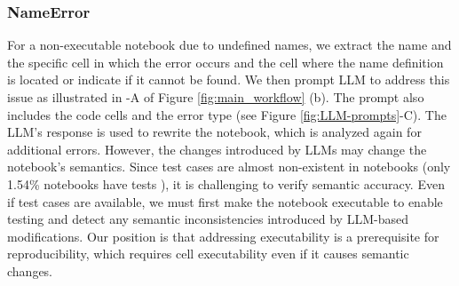      
        \subsubsection{NameError}
            For a non-executable notebook due to undefined names, we extract the name and the specific cell in which the error occurs and the cell where the name definition is located or indicate if it cannot be found.  We then prompt LLM to address this issue as illustrated in -A of Figure \ref{fig:main_workflow} (b). The prompt also includes the code cells and the error type (see Figure \ref{fig:LLM-prompts}-C). The LLM's response is used to rewrite the notebook, which is analyzed again for additional errors. However, the changes introduced by LLMs may change the notebook's semantics. Since test cases are almost non-existent in notebooks (only 1.54\% notebooks have tests \cite{Pimentel2021}), it is challenging to verify semantic accuracy. Even if test cases are available, we must first make the notebook executable to enable testing and detect any semantic inconsistencies introduced by LLM-based modifications. Our position is that addressing executability is a prerequisite for reproducibility, which requires cell executability even if it causes semantic changes.  
     
     



